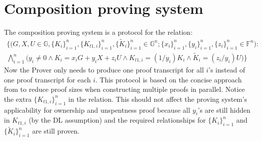 \documentclass{article}
\begin{document}
\section{Composition proving system}\label{comp-prov}
The composition proving system is a protocol for the relation:
\begin{multline*}
\Big\{\big(G, X, U\in\mathbb{G}, \{K_i\}_{i=1}^n, \{K_{t1,i}\}_{i=1}^n, \{\tilde{K}_i\}_{i=1}^n \in\mathbb{G}^n; \{x_i\}_{i=1}^n, \{y_i\}_{i=1}^n, \{z_i\}_{i=1}^n \in\mathbb{F}^n\big): \\ \bigwedge_{i=1}^n{\big(y_i \ne 0 \wedge K_i = x_i G + y_i X + z_i U \wedge K_{t1,i} = (1/y_i)K_i \wedge \tilde{K}_i = (z_i/y_i)U\big)} \Big\}
\end{multline*}
Now the Prover only needs to produce one proof transcript for all $i$'s instead of one proof transcript for each $i$. This protocol is based on the concise approach from \cite{clsag} to reduce proof sizes when constructing multiple proofs in parallel. Notice the extra $\{K_{t1,i}\}_{i=1}^n$ in the relation. This should not affect the proving system's applicability for ownership and unspentness proof because all $y_i$'s are still hidden in $K_{t1,i}$ (by the DL assumption) and the required relationships for $\{K_i\}_{i=1}^n$ and $\{\tilde{K}_i\}_{i=1}^n$ are still proven.
\end{document}
